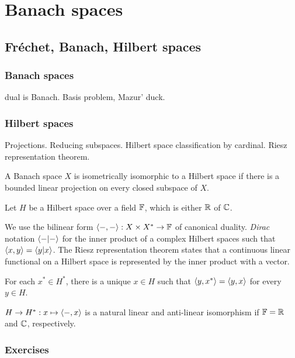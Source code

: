 \documentclass{../../large}
\begin{document}
\part{Banach spaces}

\chapter{Fr\'echet, Banach, Hilbert spaces}

\section{Banach spaces}
dual is Banach.
Basis problem, Mazur' duck.

\section{Hilbert spaces}
Projections. Reducing subspaces.
Hilbert space classification by cardinal.
Riesz representation theorem.
\begin{prb}
\begin{parts}
\item A Banach space $X$ is isometrically isomorphic to a Hilbert space if there is a bounded linear projection on every closed subspace of $X$.
\end{parts}
\end{prb}

\begin{prb}
Let $H$ be a Hilbert space over a field $\mathbb{F}$, which is either $\mathbb{R}$ of $\mathbb{C}$.


We use the bilinear form $\langle-,-\rangle:X\times X^*\to\mathbb{F}$ of canonical duality.
\emph{Dirac} notation $\langle-|-\rangle$ for the inner product of a complex Hilbert spaces such that $\langle x,y\rangle=\langle y|x\rangle$.
The Riesz representation theorem states that a continuous linear functional on a Hilbert space is represented by the inner product with a vector.
\begin{parts}
\item For each $x^*\in H^*$, there is a unique $x\in H$ such that $\langle y,x^*\rangle=\langle y,x\rangle$ for every $y\in H$.
\item $H\to H^*:x\mapsto\langle-,x\rangle$ is a natural linear and anti-linear isomorphism if $\mathbb{F}=\mathbb{R}$ and $\mathbb{C}$, respectively.
\end{parts}
\end{prb}



\section*{Exercises}
\end{document}
